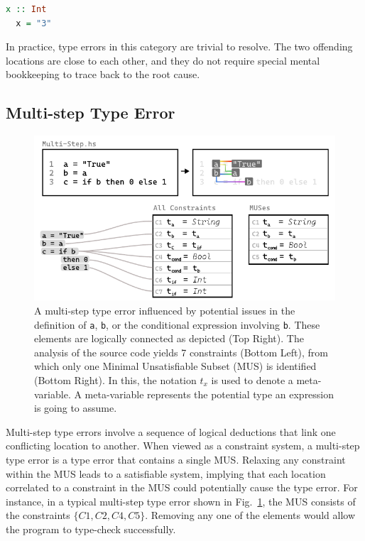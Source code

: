 \documentclass[pdflatex,lineno,sn-nature,Numbered]{sn-jnl}%
\begin{document}
\begin{lstlisting}[language=Haskell, caption=An example of a simple type error, label={lst:atomic-error}]
  x :: Int
  x = "3"
\end{lstlisting}

In practice, type errors in this category are trivial to resolve. The two offending locations are close to each other, and they do not require special mental bookkeeping to trace back to the root cause. 

\subsection{Multi-step Type Error} \label{sec:multi-step}

\begin{figure}[hbt]
  \centering \includegraphics[width=0.8\linewidth]{images/Multi-Step-MUS}
  \caption {A multi-step type error influenced by potential issues in the definition of \texttt{a}, \texttt{b}, or the conditional expression involving \texttt{b}. These elements are logically connected as depicted (Top Right). The analysis of the source code yields 7 constraints (Bottom Left), from which only one Minimal Unsatisfiable Subset (MUS) is identified (Bottom Right). In this, the notation $t_x$ is used to denote a meta-variable. A meta-variable represents the potential type an expression is going to assume.
  }
  \label{fig:multi-step-2}
  \end{figure}

  Multi-step type errors involve a sequence of logical deductions that link one conflicting location to another. When viewed as a constraint system, a multi-step type error is a type error that contains a single MUS. Relaxing any constraint within the MUS leads to a satisfiable system, implying that each location correlated to a constraint in the MUS could potentially cause the type error. For instance, in a typical multi-step type error shown in  Fig.~\ref{fig:multi-step-2}, the MUS consists of the constraints $\{C1, C2, C4, C5\}$. Removing any one of the elements would allow the program to type-check successfully.
\end{document}
